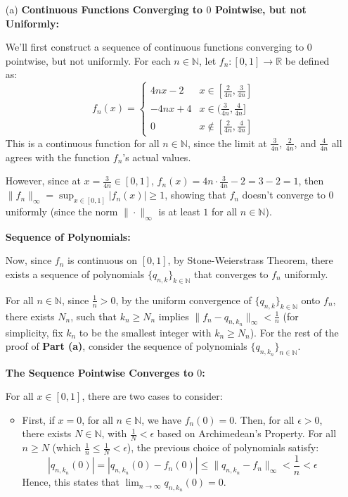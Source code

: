 \documentclass{article}
\begin{document}
\begin{itemize}
    \item[(a)] \textbf{Continuous Functions Converging to $0$ Pointwise, but not Uniformly:}

    We'll first construct a sequence of continuous functions converging to $0$ pointwise, but not uniformly. For each $n\in\mathbb{N}$, let $f_n:[0,1]\rightarrow\mathbb{R}$ be defined as:
    $$f_n(x)=\begin{cases}
        4nx-2 & x\in [\frac{2}{4n},\frac{3}{4n}]\\
        -4nx+4 & x\in (\frac{3}{4n},\frac{4}{4n}]\\
        0 & x\notin [\frac{2}{4n},\frac{4}{4n}]
    \end{cases}$$
    This is a continuous function for all $n\in\mathbb{N}$, since the limit at $\frac{3}{4n}$, $\frac{2}{4n}$, and $\frac{4}{4n}$ all agrees with the function $f_n$'s actual values.

    However, since at $x=\frac{3}{4n}\in [0,1]$, $f_n(x)=4n\cdot \frac{3}{4n}-2 = 3-2 = 1$, then $\|f_n\|_\infty = \sup_{x\in[0,1]}|f_n(x)| \geq 1$, showing that $f_n$ doesn't converge to $0$ uniformly 
    (since the norm $\|\cdot\|_\infty$ is at least $1$ for all $n\in\mathbb{N}$).

    \hfill

    \textbf{Sequence of Polynomials:}

    Now, since $f_n$ is continuous on $[0,1]$, by Stone-Weierstrass Theorem, there exists a sequence of polynomials $\{q_{n,k}\}_{k\in\mathbb{N}}$ that converges to $f_n$ uniformly.

    For all $n\in\mathbb{N}$, since $\frac{1}{n}>0$, by the uniform convergence of $\{q_{n,k}\}_{k\in\mathbb{N}}$ onto $f_n$, there exists $N_n$, such that $k_n\geq N_n$ implies $\|f_n-q_{n,k_n}\|_\infty <\frac{1}{n}$ (for simplicity, fix $k_n$ to be the smallest integer with $k_n\geq N_n$).
    For the rest of the proof of \textbf{Part (a)}, consider the sequence of polynomials $\{q_{n,k_n}\}_{n\in\mathbb{N}}$.

    \hfill

    \textbf{The Sequence Pointwise Converges to $0$:}

    For all $x\in [0,1]$, there are two cases to consider:
    \begin{itemize}
        \item First, if $x=0$, for all $n\in\mathbb{N}$, we have $f_n(0)=0$. Then, for all $\epsilon>0$, there exists $N\in\mathbb{N}$, with $\frac{1}{N}<\epsilon$ based on Archimedean's Property. For all $n\geq N$ (which $\frac{1}{n}\leq \frac{1}{N}<\epsilon$), the previous choice of polynomials satisfy:
        $$|q_{n,k_n}(0)| =|q_{n,k_n}(0)-f_n(0)| \leq \|q_{n,k_n}-f_n\|_\infty < \frac{1}{n} < \epsilon$$
        Hence, this states that $\lim_{n\rightarrow\infty}q_{n,k_n}(0) = 0$.


\end{itemize}
\end{itemize}
\end{document}
